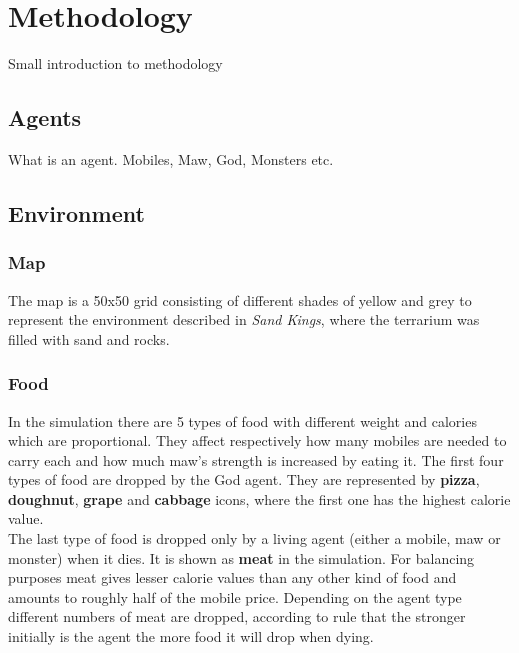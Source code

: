 \documentclass[conference]{IEEEtran}
\begin{document}
\section{Methodology}
Small introduction to methodology








\subsection{Agents}
What is an agent. Mobiles, Maw, God, Monsters etc.



\subsection{Environment}
\subsubsection{Map}

The map is a 50x50 grid consisting of different shades of yellow and grey to represent the environment described in \textit{Sand Kings}, where the terrarium was filled with sand and rocks.
\\
\subsubsection{Food}

In the simulation there are 5 types of food with different weight and calories which are proportional. They affect respectively how many mobiles are needed to carry each and how much maw's strength is increased by eating it.
The first four types of food are dropped by the God agent. They are represented by \textbf{pizza}, \textbf{doughnut}, \textbf{grape} and \textbf{cabbage} icons, where the first one has the highest calorie value.
\\
The last type of food is dropped only by a living agent (either a mobile, maw or monster) when it dies. It is shown as \textbf{meat} in the simulation. For balancing purposes meat gives lesser calorie values than any other kind of food and amounts to roughly half of the mobile price. Depending on the agent type different numbers of meat are dropped, according to rule that the stronger initially is the agent the more food it will drop when dying.
\end{document}
